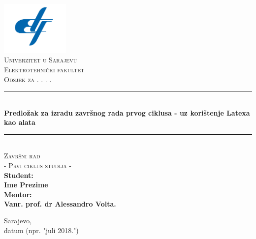 \documentclass[12pt,oneside, a4paper]{book}
\newcommand{\HRule}{\rule{\linewidth}{0.5mm}}
\begin{document}

\frontmatter

\begin{titlepage}
\begin{center}

\includegraphics[width=0.25\textwidth]{etf-logo.png}~\\[0.1cm]
\textsc{\Large Univerzitet u Sarajevu}\\[0.2cm]  
\textsc{\Large Elektrotehnički fakultet}\\[0.2cm] 
\textsc{\Large Odsjek za . . . . }\\[3cm]\HRule \\[0.5cm] 
{\huge \bfseries Predložak za izradu završnog rada prvog ciklusa - uz korištenje Latexa kao alata} \\[0.4cm] 
\HRule \\[0.5cm]

\textsc{\Large Završni rad}\\[0.4cm]
\textsc{\Large - Prvi ciklus studija - }\\[1.5cm]

\textbf{ 
\Large Student:\\  
\Large Ime Prezime\\[1cm]  
\Large Mentor: \\[0.2cm] 
\Large Vanr. prof. dr Alessandro Volta.} 
\vfill

{\large Sarajevo, \\datum (npr. "juli 2018.")}

\end{center} 
\end{titlepage}



\end{document}
